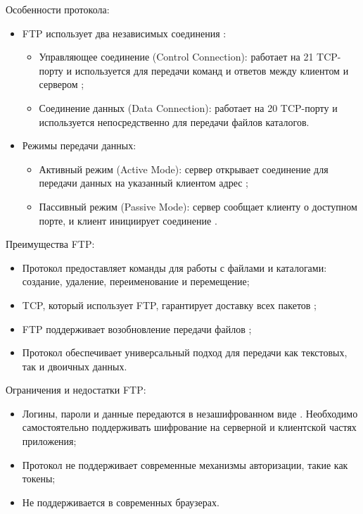	Особенности протокола:
	\begin{itemize}[label=$\bullet$]
		\item FTP использует два независимых соединения \cite{rfcFtp}:
		\begin{itemize}[label=$\circ$]
			\item Управляющее соединение (Control Connection): работает на 21 TCP-порту и используется для передачи команд и ответов между клиентом и сервером \cite{rfcFtp};
			\item Соединение данных (Data Connection): работает на 20 TCP-порту и используется непосредственно для передачи файлов каталогов.
		\end{itemize}
		\item Режимы передачи данных:
		\begin{itemize}[label=$\circ$]
			\item Активный режим (Active Mode): сервер открывает соединение для передачи данных на указанный клиентом адрес \cite{rfcFtp};
			\item Пассивный режим (Passive Mode): сервер сообщает клиенту о доступном порте, и клиент инициирует соединение \cite{rfcFtp}.
		\end{itemize}
	\end{itemize}
	
	Преимущества FTP:
	\begin{itemize}[label=$\bullet$]
		\item Протокол предоставляет команды для работы с файлами и каталогами: создание, удаление, переименование и перемещение;
		\item TCP, который использует FTP, гарантирует доставку всех пакетов \cite{rfcFtp};
		\item FTP поддерживает возобновление передачи файлов \cite{rfcFtp};
		\item Протокол обеспечивает универсальный подход для передачи как текстовых, так и двоичных данных.
	\end{itemize}
	
	Ограничения и недостатки FTP:
	\begin{itemize}[label=$\bullet$]
		\item Логины, пароли и данные передаются в незашифрованном виде \cite{rfcFtp}. Необходимо самостоятельно поддерживать шифрование на серверной и клиентской частях приложения;
		\item Протокол не поддерживает современные механизмы авторизации, такие как токены;
		\item Не поддерживается в современных браузерах.
	\end{itemize}

